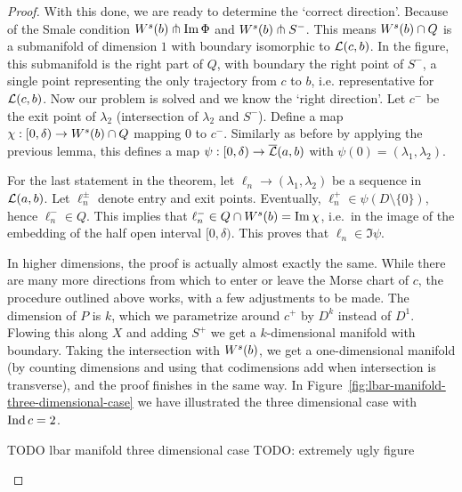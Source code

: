 \begin{proof}
    With this done, we are ready to determine the `correct direction'.
    Because of the Smale condition $W^s(b) \pitchfork \operatorname{Im} \Phi$ and  $W^s(b) \pitchfork S^{-}$.
    This means $W^s(b) \cap Q$ is a submanifold of dimension $1$ with boundary isomorphic to $\mathcal L(c, b)$.
    In the figure, this submanifold is the right part of $Q$, with boundary the right point of $S^{-}$, a single point representing the only trajectory from $c$ to $b$, i.e. representative for $\mathcal L(c, b)$.
    Now our problem is solved and we know the `right direction'.
    Let $c^{-}$ be the exit point of $\lambda_2$ (intersection of $\lambda_2$ and $S^{-}$). 
    Define a map $\chi:[0, \delta) \to  W^s(b) \cap  Q$ mapping $0$ to  $c^{-}$.
    Similarly as before by applying the previous lemma, this defines a map $\psi: [0, \delta) \to  \overline{\mathcal L}(a, b)$ with $\psi(0) = (\lambda_1, \lambda_2)$.

    For the last statement in the theorem, let $\ell_n \to  (\lambda_1, \lambda_2)$ be a sequence in $\mathcal L(a, b)$. Let $ \ell^{\pm}_n$ denote entry and exit points. 
    Eventually, $\ell_n^{+} \in \psi(D \setminus \{0\})$, hence $ \ell_n^{-} \in Q$. This implies that $ \ell_n^{-} \in Q \cap W^s(b) = \operatorname{Im} \chi$, i.e.\ in the image of the embedding of the half open interval $[0, \delta)$.
    This proves that $ \ell_n \in \Im \psi$.

    In higher dimensions, the proof is actually almost exactly the same.
    While there are many more directions from which to enter or leave the Morse chart of $c$, the procedure outlined above works, with a few adjustments to be made.
    The dimension of $P$ is $k$, which we parametrize around $c^{+}$ by $D^{k}$ instead of $D^{1}$. Flowing this along $X$ and adding $S^{+}$ we get a $k$-dimensional manifold with boundary. Taking the intersection with  $W^s(b)$, we get a one-dimensional manifold (by counting dimensions and using that codimensions add when intersection is transverse), and the proof finishes in the same way.
    In Figure~\ref{fig:lbar-manifold-three-dimensional-case} we have illustrated the three dimensional case with $\operatorname{Ind} c=2$.

\begin{marginfigure}
    \centering
    \caption{TODO lbar manifold three dimensional case TODO: extremely ugly figure}
    \label{fig:lbar-manifold-three-dimensional-case}
\end{marginfigure}
\end{proof}
